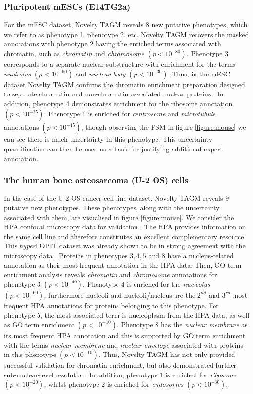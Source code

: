 \documentclass[12pt,english]{article}
\begin{document}
\subsubsection{Pluripotent mESCs (E14TG2a)}
For the mESC dataset, Novelty TAGM reveals $8$ new putative phenotypes, which we refer to as phenotype 1, phenotype 2, etc. Novelty TAGM recovers the masked annotations with phenotype $2$ having the enriched terms associated with chromatin, such as \textit{chromatin} and \textit{chromosome} $(p < 10^{-80})$. Phenotype 3 corresponds to a separate nuclear substructure with enrichment for the terms \textit{nucleolus} $(p < 10^{-60})$ and \textit{nuclear body} $(p < 10^{-30})$. Thus, in the mESC dataset Novelty TAGM confirms the chromatin enrichment preparation designed to separate chromatin and non-chromatin associated nuclear proteins \citep{Mulvey:2017}. In addition, phenotype 4 demonstrates enrichment for the ribosome annotation $(p < 10^{-35})$. Phenotype 1 is enriched for \textit{centrosome} and \textit{microtubule} annotations $(p < 10^{-15})$, though observing the PSM in figure \ref{figure:mouse} we can see there is much uncertainty in this phenotype. This uncertainty quantification can then be used as a basis for justifying additional expert annotation.

\subsubsection{The human bone osteosarcoma (U-2 OS) cells}\label{section:u2os}
In the case of the U-2 OS cancer cell line dataset, Novelty TAGM reveals $9$ putative new phenotypes. These phenotypes, along with the uncertainty associated with them, are visualised in figure \ref{figure:mouse}. We consider the HPA confocal microscopy data for validation \citep{Thul:2017, Sullivan:2018}. The HPA provides information on the same cell line and therefore constitutes an excellent complementary resource. This \textit{hyper}LOPIT dataset was already shown to be in strong agreement with the microscopy data \citep{Thul:2017, DC:2018}. Proteins in phenotypes $3,4,5$ and $8$ have a nucleus-related annotation as their most frequent annotation in the HPA data. Then, GO term enrichment analysis reveals \textit{chromatin} and \textit{chromosome} annotations for phenotype 3 $(p < 10^{-40})$. Phenotype $4$ is enriched for the \textit{nucleolus} $(p < 10^{-60})$, furthermore nucleoli and nucleoli/nucleus are the $2^{nd}$ and $3^{rd}$ most frequent HPA annotations for proteins belonging to this phenotype. For phenotype 5, the most associated term is nucleoplasm from the HPA data, as well as GO term enrichment $(p < 10^{-10})$. Phenotype $8$ has the \textit{nuclear membrane} as its most frequent HPA annotation and this is supported by GO term enrichment with the terms \textit{nuclear membrane} and \textit{nuclear envelope} associated with proteins in this phenotype $(p < 10^{-10})$. Thus, Novelty TAGM has not only provided successful validation for chromatin enrichment, but also demonstrated further sub-nuclear-level resolution. In addition, phenotype $1$ is enriched for \textit{ribosome} $( p < 10^{-20})$, whilst phenotype $2$ is enriched for \textit{endosomes} $(p < 10^{-30})$.
\end{document}
